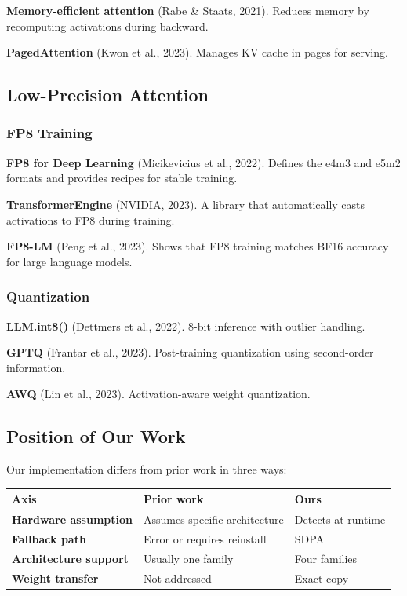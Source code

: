 \textbf{Memory-efficient attention} (Rabe \& Staats, 2021). Reduces memory by 
recomputing activations during backward.

\textbf{PagedAttention} (Kwon et al., 2023). Manages KV cache in pages for 
serving.

\subsection{Low-Precision Attention}

\subsubsection{FP8 Training}

\textbf{FP8 for Deep Learning} (Micikevicius et al., 2022). Defines the e4m3 and 
e5m2 formats and provides recipes for stable training.

\textbf{TransformerEngine} (NVIDIA, 2023). A library that automatically casts 
activations to FP8 during training.

\textbf{FP8-LM} (Peng et al., 2023). Shows that FP8 training matches BF16 
accuracy for large language models.

\subsubsection{Quantization}

\textbf{LLM.int8()} (Dettmers et al., 2022). 8-bit inference with outlier handling.

\textbf{GPTQ} (Frantar et al., 2023). Post-training quantization using second-order 
information.

\textbf{AWQ} (Lin et al., 2023). Activation-aware weight quantization.

\subsection{Position of Our Work}

Our implementation differs from prior work in three ways:

\begin{table}[H]
\centering
\small
\begin{tabular}{lll}
\toprule
\textbf{Axis} & \textbf{Prior work} & \textbf{Ours} \\
\midrule
\textbf{Hardware assumption} & Assumes specific architecture & Detects at runtime \\
\textbf{Fallback path} & Error or requires reinstall & SDPA \\
\textbf{Architecture support} & Usually one family & Four families \\
\textbf{Weight transfer} & Not addressed & Exact copy \\
\bottomrule
\end{tabular}
\end{table}

